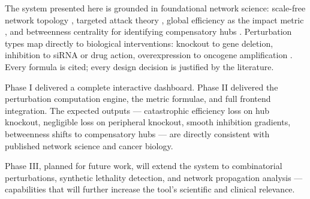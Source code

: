 \documentclass[12pt,a4paper]{report}
\begin{document}
The system presented here is grounded in foundational network science: scale-free network topology \citep{barabasi2004network}, targeted attack theory \citep{albert2000error}, global efficiency as the impact metric \citep{latora2001efficient, crucitti2003efficiency}, and betweenness centrality for identifying compensatory hubs \citep{freeman1977set, jeong2001lethality}. Perturbation types map directly to biological interventions: knockout to gene deletion, inhibition to siRNA or drug action, overexpression to oncogene amplification \citep{morgan2019perturbation}. Every formula is cited; every design decision is justified by the literature.

Phase I delivered a complete interactive dashboard. Phase II delivered the perturbation computation engine, the metric formulae, and full frontend integration. The expected outputs — catastrophic efficiency loss on hub knockout, negligible loss on peripheral knockout, smooth inhibition gradients, betweenness shifts to compensatory hubs — are directly consistent with published network science and cancer biology.

Phase III, planned for future work, will extend the system to combinatorial perturbations, synthetic lethality detection, and network propagation analysis — capabilities that will further increase the tool's scientific and clinical relevance.



\end{document}
